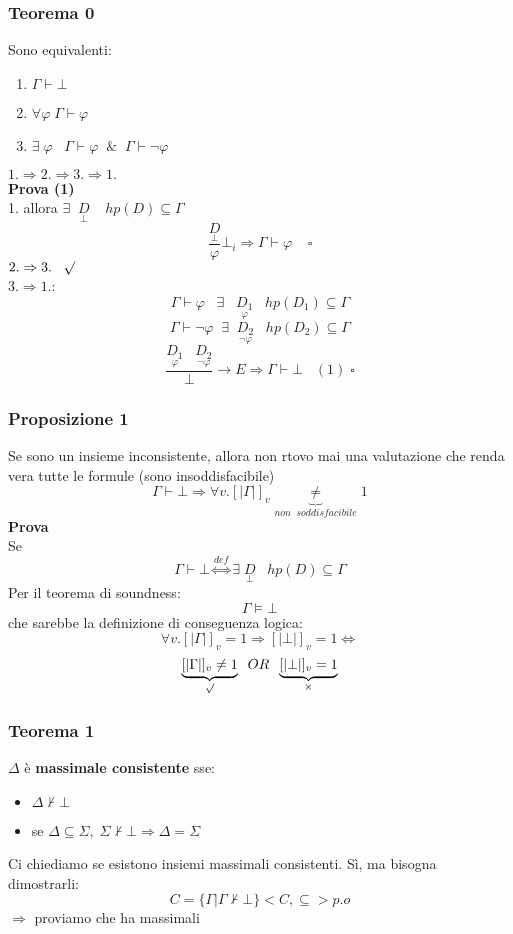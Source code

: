 \documentclass{article}
\theoremstyle{break}
\theoremstyle{break}
\theoremstyle{break}
\theoremstyle{break}
\begin{document}
\subsubsection{Teorema 0}
Sono equivalenti:
\begin{enumerate}
  \item \( \Gamma \vdash \bot \) 
  \item \( \forall \varphi \; \Gamma \vdash \varphi \) 
  \item \( \exists \; \varphi\;\;\; \Gamma \vdash \varphi\;\; \&\;\; \Gamma \vdash \neg \varphi \) 
\end{enumerate}
\( 1. \Rightarrow 2. \Rightarrow 3. \Rightarrow 1. \)\\
\textbf{Prova (1)}\\
1. allora \( \exists\;\; \underset{\bot}{D} \;\;\;\; hp(D) \subseteq \Gamma \) 
\[
  \frac{\underset{\bot}{D}}{\varphi}\bot_i \Rightarrow \Gamma \vdash \varphi \;\;\;\; \square
\] 
\( 2. \Rightarrow 3.\;\;\; \surd \)\\
\( 3. \Rightarrow 1. \):
\[
  \Gamma \vdash \varphi\;\;\; \exists \;\;\; \underset{\varphi}{D_1} \;\;\; hp(D_1) \subseteq \Gamma
\] 
\[
  \Gamma \vdash \neg \varphi \;\; \exists  \;\; \underset{\neg \varphi}{D_2} \;\;\; hp(D_2) \subseteq \Gamma
\] 
\[
  \frac{\underset{\varphi}{D_1}\;\;\;\underset{\neg \varphi}{D_2}}{\bot} \to E \Rightarrow \Gamma \vdash \bot \;\;\; (1)\; \square
\] 
\subsubsection{Proposizione 1}
Se sono un insieme inconsistente, allora non rtovo mai una valutazione che renda vera tutte le formule (sono insoddisfacibile)
\[
  \Gamma \vdash \bot \Rightarrow \forall v. [|\Gamma|]_v \underbrace{\neq}_{non\;\; soddisfacibile} 1
\] 
\textbf{Prova}\\
Se
\[
  \Gamma \vdash \bot \stackrel{def}{\Leftrightarrow} \exists \;\underset{\bot}{D} \;\;\; hp(D) \subseteq \Gamma
\] 
Per il teorema di soundness:
\[
\Gamma \models \bot
\] 
che sarebbe la definizione di conseguenza logica:
\[
  \forall v. [|\Gamma|]_v=1 \Rightarrow [|\bot|]_v=1 \Leftrightarrow
\] 
\[
  \underbrace{[|\Gamma|]_v \neq 1}_{\surd} \;\;OR\;\; \underbrace{[|\bot|]_v=1}_{\times }
\] 

\subsubsection{Teorema 1}
\begin{definition}
  \( \Delta \) è \textbf{massimale consistente} sse:
  \begin{itemize}
    \item \( \Delta \not\vdash \bot \) 
    \item se \( \Delta \subseteq \Sigma,\; \Sigma \not\vdash \bot \Rightarrow \Delta = \Sigma \)
  \end{itemize}
  Ci chiediamo se esistono insiemi massimali consistenti. Sì, ma bisogna dimostrarli:
  \[
  C = \{\Gamma | \Gamma \not\vdash \bot\} <C,\subseteq> p.o
  \] 
  \( \Rightarrow \) proviamo che ha massimali
\end{definition}
\end{document}
